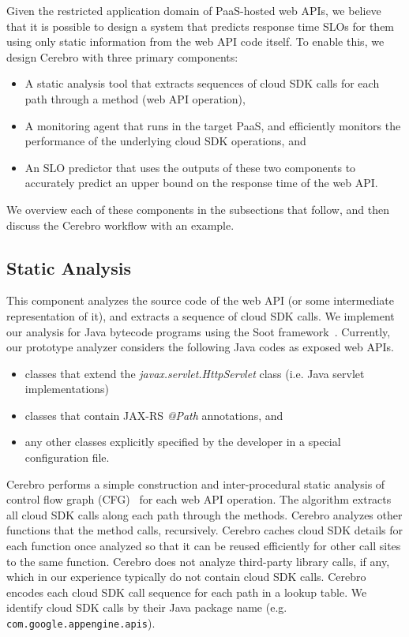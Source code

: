 Given the restricted application domain of PaaS-hosted web APIs, we believe
that it is possible to design a system that predicts response time SLOs for
them using only static information from the web API code itself.  To enable
this, we design Cerebro with three primary components:
\begin{itemize}
\item A static analysis tool that extracts sequences of cloud SDK calls for 
each path through a method (web API operation),
\item A monitoring agent that runs in the target PaaS, and efficiently monitors 
the performance of the underlying cloud SDK operations, and
\item An SLO predictor that uses the outputs of these two components to 
accurately predict an upper bound on the response time of the web API.
\end{itemize}
We overview each of these components in the subsections that follow, and then 
discuss the Cerebro workflow with an example.

\subsection{Static Analysis}
 This component analyzes the source code of the web API
(or some intermediate representation of it), and extracts a sequence of cloud SDK calls.
We implement our analysis for Java bytecode programs
using the Soot framework~\cite{Vallee-Rai:2010:SJB:1925805.1925818}.
Currently, our prototype analyzer considers the 
following Java codes as exposed web APIs.
\begin{itemize}
\item classes that extend the \textit{javax.servlet.HttpServlet} class (i.e. Java servlet implementations)
\item classes that contain JAX-RS \textit{@Path} annotations, and
\item any other classes explicitly specified by the developer in a special configuration file.
\end{itemize}

Cerebro performs a simple construction and inter-procedural static analysis 
of control flow graph 
(CFG)~\cite{Allen:1970:CFA:800028.808479,Aho:1986:CPT:6448,Morgan:1998:BOC:288765,Muchnick:1998:ACD:286076} for each web API operation.
The algorithm extracts all cloud SDK calls along
each path through the methods. Cerebro analyzes other functions
that the method calls, recursively.  Cerebro caches cloud SDK details for each function 
once analyzed so that it can be reused efficiently for other call sites to the same
function. Cerebro does not analyze third-party library calls, if any, 
which in our experience typically do not contain cloud SDK calls. Cerebro encodes
each cloud SDK call sequence for each path in a lookup table. We identify
cloud SDK calls by their Java package name (e.g. \texttt{com.google.appengine.apis}).

